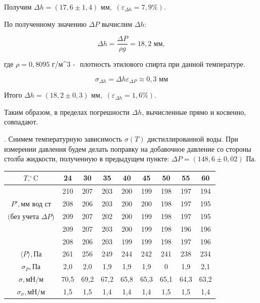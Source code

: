 \documentclass[a4paper,12pt]{article} %
\begin{document}
{\medskip
\noindent Получим { $\Delta h = (17,6 \pm 1,4) \text{ мм},$} $(\varepsilon_{\Delta h} = 7,9 \%) $.
\medskip

\noindent По полученному значению $\Delta P$ вычислим $\Delta h$:

\medskip
 
\begin{equation}
\Delta h = \frac{\Delta P}{\rho g} = 18,2 \text{ мм}, 
\end{equation}

\medskip

\noindent где $\rho = 0,8095$ г/м^3 - $\text{ плотность этилового спирта при данной температуре}$.

\medskip

\begin{equation}
\sigma_{\Delta h} = \Delta h \varepsilon_{\Delta P} \approx 0,3 \text{ мм}
\end{equation}

\medskip

\noindent Итого { $\Delta h = (18,2 \pm 0,3) \text{ мм},$} $(\varepsilon_{\Delta h} = 1,6 \%) $.

\medskip

\noindent Таким образом, в пределах погрешности $\Delta h$, вычисленные прямо и косвенно, совпадают.

\medskip

. Снимем температурную зависимость $\sigma (T)$ дистиллированной воды. При измерении давления будем делать поправку на добавочное давление со стороны столба жидкости, полученную в предыдущем пункте: {$\Delta P = (148,6 \pm 0,02) \text{ Па}.$}
\medskip

\begin{tabular}{|c|c|c|c|c|c|c|c|c|}
\hline 
$T, ^\circ\text{C}$ & 24 & 30 & 35 & 40 & 45 & 50 & 55 & 60 \\ 
\hline 
 & 210 & 207 & 203 & 200 & 199 & 198 & 197 & 194 \\ 
\hhline{~--------} 
 $P', \text{мм вод ст}$ & 208 & 206 & 203 & 200 & 200 & 198 & 197 & 195 \\ 
\hhline{~--------} 
 $\text{(без учета } \Delta P \text{)}$ & 209 & 207 & 202 & 200 & 199 & 198 & 197 & 195 \\ 
\hhline{~--------} 
 & 209 & 207 & 203 & 200 & 199 & 198 & 196 & 196 \\ 
\hhline{~--------} 
 & 208 & 206 & 203 & 199 & 199 & 198 & 197 & 196 \\ 
\hline 
$\langle P \rangle, \text{Па}$ & 261 & 256 & 249 & 244 & 242 & 241 & 238 & 234 \\ 
\hline 
$\sigma_{P}, \text{Па}$ & 2,0 & 2,0 & 1,9 & 1,9 & 1,9 & 0 & 1,9 & 2,1 \\ 
\hline 
$\sigma, \text{мН/м}$ & 70,5 & 69,2 & 67,2 & 65,8 & 65,3 & 65,1 & 64,3 & 63,2 \\ 
\hline 
$\sigma_{\sigma}, \text{мН/м}$ & 1,5 & 1,5 & 1,4 & 1,4 & 1,4 & 1,5 & 1,5 & 1,4 \\ 
\hline 
\end{tabular} 

}
\end{document}
